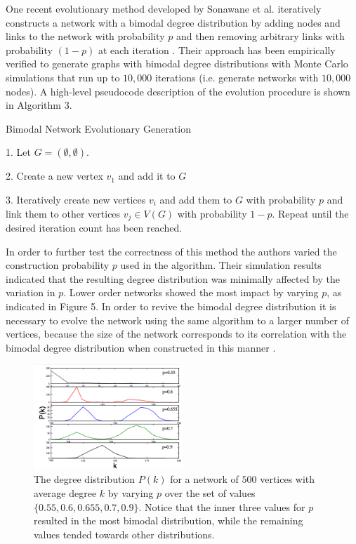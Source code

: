 \documentclass[doc]{apa}%
\begin{document}
One recent evolutionary method developed by Sonawane et al. iteratively constructs a network with a bimodal degree distribution by adding nodes and links to the network with probability $p$ and then removing arbitrary links with probability $(1-p)$ at each iteration \cite{bimodal}. Their approach has been empirically verified to generate graphs with bimodal degree distributions with Monte Carlo simulations that run up to $10,000$ iterations (i.e. generate networks with $10,000$ nodes).  A high-level pseudocode description of the evolution procedure is shown in Algorithm 3.

\begin{algorithm}
\caption{Bimodal Network Evolutionary Generation}
\label{alg2}
\begin{algorithmic}
	\item 1. Let $G = (\emptyset, \emptyset)$. 
	\item 2. Create a new vertex $v_1$ and add it to $G$
	\item 3. Iteratively create new vertices $v_i$ and add them to $G$ with probability $p$ and link them to other vertices $v_j \in V(G)$ with probability $1-p$. Repeat until the desired iteration count has been reached.
\end{algorithmic}
\end{algorithm}

In order to further test the correctness of this method the authors varied the construction probability $p$ used in the algorithm. Their simulation results indicated that the resulting degree distribution was minimally affected by the variation in $p$. Lower order networks showed the most impact by varying $p$, as indicated in Figure 5. In order to revive the bimodal degree distribution it is necessary to evolve the network using the same algorithm to a larger number of vertices, because the size of the network corresponds to its correlation with the bimodal degree distribution when constructed in this manner \cite{bimodal}.

\begin{figure}[h!]
	\label{fig:distribution}
	\centering
		\includegraphics[width=0.5\textwidth]{evol_distribution.png}
	\caption{The degree distribution $P(k)$ for a network of $500$ vertices with average degree $k$ by varying $p$ over the set of values $\{0.55, 0.6, 0.655, 0.7, 0.9\}$. Notice that the inner three values for $p$ resulted in the most bimodal distribution, while the remaining values tended towards other distributions.}
\end{figure}
\end{document}
